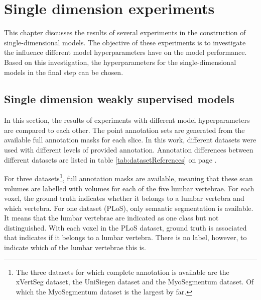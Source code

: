 \chapter{Single dimension experiments \label{sec:singleDimension}}
\par{
    This chapter discusses the results of several experiments in the construction of single-dimensional models.
    The objective of these experiments is to investigate the influence different model hyperparameters have on the model performance.
    Based on this investigation, the hyperparameters for the single-dimensional models in the final step can be chosen.  
}
\section{Single dimension weakly supervised models}
\par{
    In this section, the results of experiments with different model hyperparameters are compared to each other.
    The point annotation sets are generated from the available full annotation masks for each slice.
    In this work, different datasets were used with different levels of provided annotation. 
    Annotation differences between different datasets are listed in table \ref{tab:datasetReferences} on page \pageref{tab:datasetReferences}.
}
\par{
    For three datasets\footnote{The three datasets for which complete annotation is available are the xVertSeg dataset, the UniSiegen dataset and the MyoSegmentum dataset. Of which the MyoSegmentum dataset is the largest by far.},
    full annotation masks are available, meaning that these scan volumes are labelled with volumes for each of the five lumbar vertebrae.
    For each voxel, the ground truth indicates whether it belongs to a lumbar vertebra and which vertebra.
    For one dataset (PLoS), only semantic segmentation is available. It means that the lumbar vertebrae are indicated as one class but not distinguished. 
    With each voxel in the PLoS dataset, ground truth is associated that indicates if it belongs to a lumbar vertebra. There is no label, however, to indicate which of the lumbar vertebrae this is.
}
